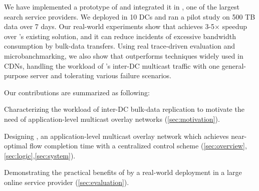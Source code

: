 We have implemented a prototype of \name and integrated it in
\company, one of the largest search service providers.
We deployed \name in 10 DCs and ran a pilot study on 500 TB
data over 7 days.
Our real-world experiments show that \name achieves 3-5$\times$
speedup over \company's existing solution, and it can reduce
incidents of excessive bandwidth consumption by bulk-data
transfers.
Using real trace-driven evaluation and microbanchmarking,
we also show that \name outperforms techniques widely used in
CDNs, handling the workload of \company's
inter-DC multicast traffic with one general-purpose server
and tolerating various failure scenarios.


Our contributions are summarized as following:
\begin{packeditemize}
\item Characterizing the workload of inter-DC bulk-data
replication to motivate the need of application-level
multicast overlay networks (\Section\ref{sec:motivation}).
\item Designing \name, an application-level
multicast overlay network which achieves near-optimal flow completion
time with a centralized control scheme (\Section\ref{sec:overview},\ref{sec:logic},\ref{sec:system}).
\item Demonstrating the practical benefits of \name by a real-world
 deployment in a large online service provider (\Section\ref{sec:evaluation}).
\end{packeditemize}
